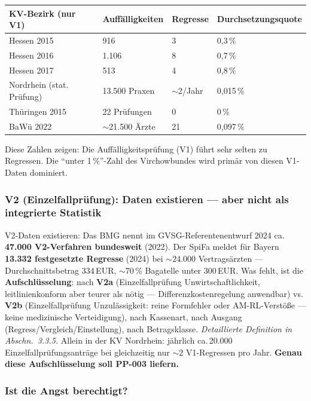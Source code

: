 \documentclass{umbruch-position}
\begin{document}
{\small
\begin{tabularx}{\textwidth}{X X X X}
\toprule
\textbf{KV-Bezirk (nur V1)} & \textbf{Auffälligkeiten} & \textbf{Regresse} & \textbf{Durchsetzungsquote} \\
\midrule
Hessen 2015 & 916 & 3 & 0,3\,\% \\
Hessen 2016 & 1.106 & 8 & 0,7\,\% \\
Hessen 2017 & 513 & 4 & 0,8\,\% \\
Nordrhein (stat. Prüfung) & 13.500 Praxen & $\sim$2/Jahr & 0,015\,\% \\
Thüringen 2015 & 22 Prüfungen & 0 & 0\,\% \\
BaWü 2022 & $\sim$21.500 Ärzte & 21 & 0,097\,\% \\
\bottomrule
\end{tabularx}
}

Diese Zahlen zeigen: Die Auffälligkeitsprüfung (V1) führt sehr selten zu Regressen. Die ``unter 1\,\%''-Zahl des Virchowbundes wird primär von diesen V1-Daten dominiert.

\subsubsection{V2 (Einzelfallprüfung): Daten existieren --- aber nicht als integrierte Statistik}

V2-Daten existieren: Das BMG nennt im GVSG-Referentenentwurf 2024 ca.\,\textbf{47.000 V2-Verfahren bundesweit} (2022). Der SpiFa meldet für Bayern \textbf{13.332 festgesetzte Regresse} (2024) bei ${\sim}$24.000 Vertragsärzten --- Durchschnittsbetrag 334\,EUR, ${\sim}$70\,\% Bagatelle unter 300\,EUR. Was fehlt, ist die \textbf{Aufschlüsselung}: nach \textbf{V2a} (Einzelfallprüfung Unwirtschaftlichkeit, leitlinienkonform aber teurer als nötig --- Differenzkostenregelung anwendbar) vs. \textbf{V2b} (Einzelfallprüfung Unzulässigkeit: reine Formfehler oder AM-RL-Verstöße --- keine medizinische Verteidigung), nach Kassenart, nach Ausgang (Regress/Vergleich/Einstellung), nach Betragsklasse. \textit{Detaillierte Definition in Abschn.~3.3.5.} Allein in der KV Nordrhein: jährlich ca.\,20.000 Einzelfallprüfungsanträge bei gleichzeitig nur $\sim$2 V1-Regressen pro Jahr. \textbf{Genau diese Aufschlüsselung soll PP-003 liefern.}

\subsubsection{Ist die Angst berechtigt?}
\end{document}

